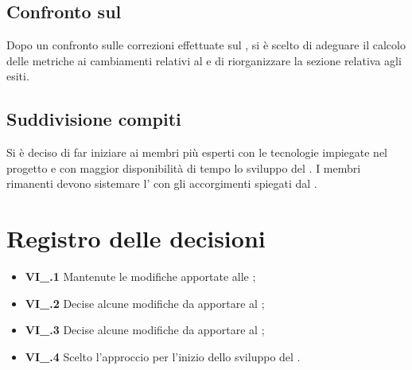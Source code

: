 \subsection{Confronto sul \PdQ}
Dopo un confronto sulle correzioni effettuate sul \PdQ{}, si è scelto di adeguare il calcolo delle metriche ai cambiamenti relativi al \PdP{} e di riorganizzare la sezione relativa agli esiti.
\subsection{Suddivisione compiti}
Si è deciso di far iniziare ai membri più esperti con le tecnologie impiegate nel progetto e con maggior disponibilità di tempo lo sviluppo del . I membri rimanenti devono sistemare l'\AdR{} con gli accorgimenti spiegati dal \CR{}.

\section{Registro delle decisioni}
\begin{itemize}
	\item \textbf{VI\_\Data.1} Mantenute le modifiche apportate alle \NdP{};
	\item \textbf{VI\_\Data.2} Decise alcune modifiche da apportare al \PdP{};
	\item \textbf{VI\_\Data.3} Decise alcune modifiche da apportare al \PdQ{};
	\item \textbf{VI\_\Data.4} Scelto l'approccio per l'inizio dello sviluppo del .

\end{itemize}